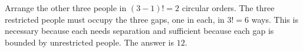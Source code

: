 Arrange the other three people in $(3-1)!=2$ circular orders. The three restricted people must occupy the three gaps, one in each, in $3!=6$ ways. This is necessary because each needs separation and sufficient because each gap is bounded by unrestricted people. The answer is $\boxed{12}$.
